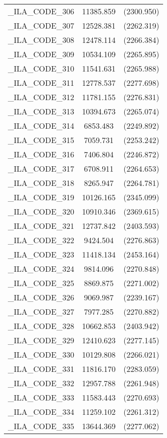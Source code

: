 {\begin{table}[htbp]
\begin{tabular}{l c c }
\_ILA\_CODE\_306  &  11385.859  & (2300.950)\\
\_ILA\_CODE\_307  &  12528.381  & (2262.319)\\
\_ILA\_CODE\_308  &  12478.114  & (2266.384)\\
\_ILA\_CODE\_309  &  10534.109  & (2265.895)\\
\_ILA\_CODE\_310  &  11541.631  & (2265.988)\\
\_ILA\_CODE\_311  &  12778.537  & (2277.698)\\
\_ILA\_CODE\_312  &  11781.155  & (2276.831)\\
\_ILA\_CODE\_313  &  10394.673  & (2265.074)\\
\_ILA\_CODE\_314  &  6853.483  & (2249.892)\\
\_ILA\_CODE\_315  &  7059.731  & (2253.242)\\
\_ILA\_CODE\_316  &  7406.804  & (2246.872)\\
\_ILA\_CODE\_317  &  6708.911  & (2264.653)\\
\_ILA\_CODE\_318  &  8265.947  & (2264.781)\\
\_ILA\_CODE\_319  &  10126.165  & (2345.099)\\
\_ILA\_CODE\_320  &  10910.346  & (2369.615)\\
\_ILA\_CODE\_321  &  12737.842  & (2403.593)\\
\_ILA\_CODE\_322  &  9424.504  & (2276.863)\\
\_ILA\_CODE\_323  &  11418.134  & (2453.164)\\
\_ILA\_CODE\_324  &  9814.096  & (2270.848)\\
\_ILA\_CODE\_325  &  8869.875  & (2271.002)\\
\_ILA\_CODE\_326  &  9069.987  & (2239.167)\\
\_ILA\_CODE\_327  &  7977.285  & (2270.882)\\
\_ILA\_CODE\_328  &  10662.853  & (2403.942)\\
\_ILA\_CODE\_329  &  12410.623  & (2277.145)\\
\_ILA\_CODE\_330  &  10129.808  & (2266.021)\\
\_ILA\_CODE\_331  &  11816.170  & (2283.059)\\
\_ILA\_CODE\_332  &  12957.788  & (2261.948)\\
\_ILA\_CODE\_333  &  11583.443  & (2270.693)\\
\_ILA\_CODE\_334  &  11259.102  & (2261.312)\\
\_ILA\_CODE\_335  &  13644.369  & (2277.062)\\

\end{tabular}
\end{table}}
